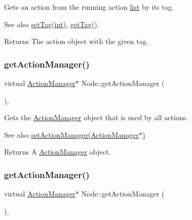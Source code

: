 Gets an action from the running action \hyperlink{protocollist-p}{list} by its tag.

\begin{DoxySeeAlso}{See also}
{\ttfamily \hyperlink{classNode_a41ecfc5e9e398e70dfe2e158f926c16f}{set\+Tag(int)}}, {\ttfamily \hyperlink{classNode_a9f18b6db8146f2660e8761bb9557d1fe}{get\+Tag()}}.
\end{DoxySeeAlso}
\begin{DoxyReturn}{Returns}
The action object with the given tag. 
\end{DoxyReturn}
\mbox{\label{classNode_a4e089841bc08a8753c65b7bb4f96aac5}} 
\subsubsection{\texorpdfstring{get\+Action\+Manager()}{getActionManager()}\hspace{0.1cm}{\footnotesize\ttfamily [1/2]}}
{\footnotesize\ttfamily virtual \hyperlink{classActionManager}{Action\+Manager}$\ast$ Node\+::get\+Action\+Manager (\begin{DoxyParamCaption}{ }\end{DoxyParamCaption})\hspace{0.3cm}{\ttfamily [inline]}, {\ttfamily [virtual]}}

Gets the \hyperlink{classActionManager}{Action\+Manager} object that is used by all actions. \begin{DoxySeeAlso}{See also}
\hyperlink{classNode_a2807ac202214bee721a75c098da54bc6}{set\+Action\+Manager(\+Action\+Manager$\ast$)} 
\end{DoxySeeAlso}
\begin{DoxyReturn}{Returns}
A \hyperlink{classActionManager}{Action\+Manager} object. 
\end{DoxyReturn}
\mbox{\label{classNode_a4e089841bc08a8753c65b7bb4f96aac5}} 
\subsubsection{\texorpdfstring{get\+Action\+Manager()}{getActionManager()}\hspace{0.1cm}{\footnotesize\ttfamily [2/2]}}
{\footnotesize\ttfamily virtual \hyperlink{classActionManager}{Action\+Manager}$\ast$ Node\+::get\+Action\+Manager (\begin{DoxyParamCaption}{ }\end{DoxyParamCaption})\hspace{0.3cm}{\ttfamily [inline]}, {\ttfamily [virtual]}}

